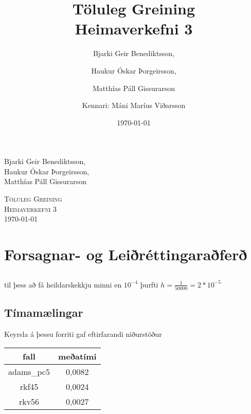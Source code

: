 \documentclass[a4]{article}
\title{Töluleg Greining\\ Heimaverkefni 3}
\date{\today{}}
\author{ 
  Bjarki Geir Benediktsson,\and
  Haukur Óskar Þorgeirsson,\and
  Matthías Páll Gissurarson \and
  Kennari: Máni Maríus Viðarsson
  }
\begin{document}
\begin{flushright}
  Bjarki Geir Benediktsson,\\
  Haukur Óskar Þorgeirsson,\\
  Matthías Páll Gissurarson\\
\end{flushright}

\begin{center}
 \textsc{ \LARGE Töluleg Greining\\
  Heimaverkefni 3\\
  \today{}
  }
  \end{center}
\vfill

\maketitle
\section{Forsagnar- og Leiðréttingaraðferð}
\subsection{}

\subsection{}


\subsection{}
til þess að fá heildarskekkju minni en $10^{-4}$ þurfti $h=\frac{1}{50000}=2*10^{-5}$

\subsection{Tímamælingar}

Keyrsla á þessu forriti gaf eftirfarandi niðurstöður\\
\begin{tabular}{|c|c|}
\hline
fall		&meðatími \\\hline
adams\_pc5	&0,0082\\\hline
rkf45		&0,0024\\\hline
rkv56		&0,0027\\\hline
\end{tabular}
\end{document}
